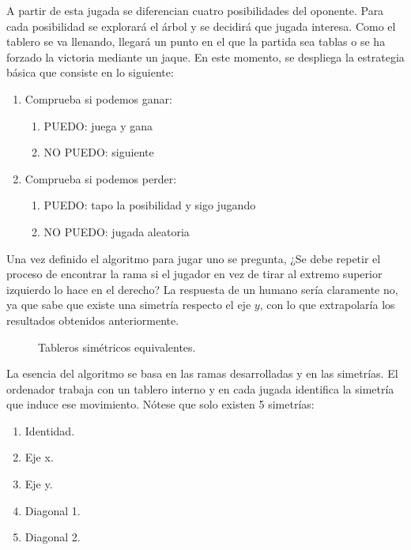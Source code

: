 \documentclass[11pt]{article}
\begin{document}
A partir de esta jugada se diferencian cuatro posibilidades del oponente. Para
cada posibilidad se explorará el árbol y se decidirá que jugada interesa. Como
el tablero se va llenando, llegará un punto en el que la partida sea tablas o se
ha forzado la victoria mediante un jaque. En este momento, se despliega la
estrategia básica que consiste en lo siguiente:

\begin{enumerate}
  \item Comprueba si podemos ganar:
  \begin{enumerate}
    \item PUEDO: juega y gana
    \item NO PUEDO: siguiente
  \end{enumerate}
  \item Comprueba si podemos perder:
  \begin{enumerate}
    \item PUEDO: tapo la posibilidad y sigo jugando
    \item NO PUEDO: jugada aleatoria
  \end{enumerate}
\end{enumerate}

Una vez definido el algoritmo para jugar uno se pregunta, ¿Se debe repetir el
proceso de encontrar la rama si el jugador en vez de tirar al extremo superior
izquierdo lo hace en el derecho? La respuesta de un humano sería claramente no,
ya que sabe que existe una simetría respecto el eje $y$, con lo que extrapolaría
los resultados obtenidos anteriormente. \\

\begin{figure}[htbp]
  \centering
  \scalebox{.35}{}
  \hspace{1cm}
  \scalebox{.35}{}
  \hspace{1cm}
  \scalebox{.35}{}
  \caption{Tableros simétricos equivalentes.}
  \label{fig:simetrias}
\end{figure}

La esencia del algoritmo se basa en las ramas desarrolladas y en las
simetrías. El ordenador trabaja con un tablero interno y en cada jugada
identifica la simetría que induce ese movimiento. Nótese que solo existen 5
simetrías:

\begin{enumerate}
  \item Identidad.
  \item Eje x.
  \item Eje y.
  \item Diagonal 1.
  \item Diagonal 2.
\end{enumerate}
\end{document}
